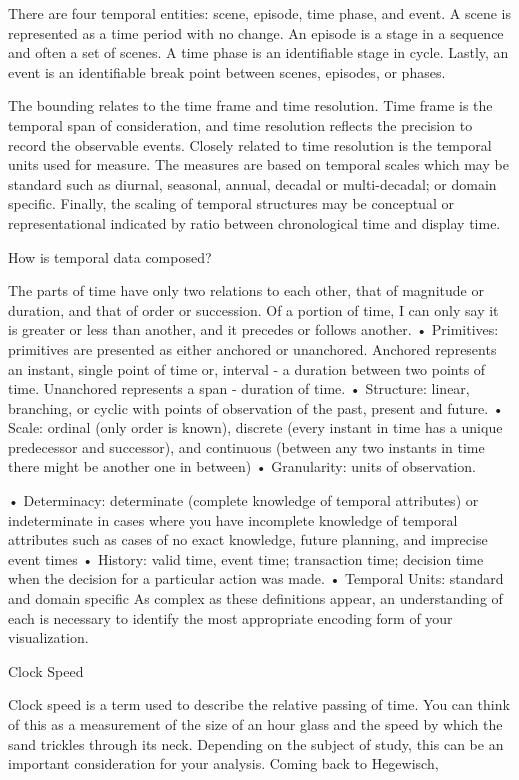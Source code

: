 There are four temporal entities: scene, episode, time phase, and event. A scene is represented as a time period with no change. An episode is a stage in a sequence and often a set of scenes. A time phase is an identifiable stage in cycle. Lastly, an event is an identifiable break point between scenes, episodes, or phases.

The bounding relates to the time frame and time resolution. Time frame is the temporal span of consideration, and time resolution reflects the precision to record the observable events. Closely related to time resolution is the temporal units used for measure. The measures are based on temporal scales which may be standard such as diurnal, seasonal, annual, decadal or multi-decadal; or domain specific. Finally, the scaling of temporal structures may be conceptual or representational indicated by ratio between chronological time and display time.

How is temporal data composed?

The parts of time have only two relations to each other, that of magnitude or duration, and that of order or
succession. Of a portion of time, I can only say it is greater or less than another, and it precedes or follows
another.
• Primitives: primitives are presented as either anchored or unanchored. Anchored represents an instant, single point of time or, interval - a duration between two points of time. Unanchored represents a span - duration of time.
• Structure: linear, branching, or cyclic with points of observation of the past, present and future.
• Scale: ordinal (only order is known), discrete (every instant in time has a unique predecessor and successor), and continuous (between any two instants in time there might be another one in between)
• Granularity: units of observation.

• Determinacy: determinate (complete knowledge of temporal attributes) or indeterminate in cases where you have incomplete knowledge of temporal attributes such as cases of no exact knowledge, future planning, and imprecise event times
• History: valid time, event time; transaction time; decision time when the decision for a particular action was made.
• Temporal Units: standard and domain specific
As complex as these definitions appear, an understanding of each is necessary to identify the most appropriate encoding form of your visualization.

Clock Speed

Clock speed is a term used to describe the relative passing of time. You can think of this as a measurement of the size of an hour glass and the speed by which the sand trickles through its neck. Depending on the subject of study, this can be an important consideration for your analysis. Coming back to Hegewisch, 

